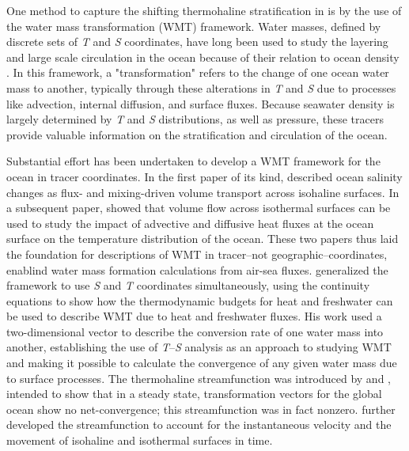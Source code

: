 \documentclass[draft]{agujournal2019}
\begin{document}
One method to capture the shifting thermohaline stratification in is by the use of the water mass transformation (WMT) framework. Water masses, defined by discrete sets of \emph{T} and  \emph{S} coordinates, have long been used to study the layering and large scale circulation in the ocean because of their relation to ocean density \cite{sverdrup1942}. In this framework, a "transformation" refers to the change of one ocean water mass to another, typically through these alterations in \emph{T} and \emph{S} due to processes like advection, internal diffusion, and surface fluxes. Because seawater density is largely determined by \emph{T} and \emph{S} distributions, as well as pressure, these tracers provide valuable information on the stratification and circulation of the ocean.

Substantial effort has been undertaken to develop a WMT framework for the ocean in tracer coordinates. In the first paper of its kind,  described ocean salinity changes as flux- and mixing-driven volume transport across isohaline surfaces. In a subsequent paper,  showed that volume flow across isothermal surfaces can be used to study the impact of advective and diffusive heat fluxes at the ocean surface on the temperature distribution of the ocean. These two papers thus laid the foundation for descriptions of WMT in tracer--not geographic--coordinates, enablind water mass formation calculations from air-sea fluxes.  generalized the  framework to use \emph{S} and \emph{T} coordinates simultaneously, using the continuity equations to show how the thermodynamic budgets for heat and freshwater can be used to describe WMT due to heat and freshwater fluxes. His work used a two-dimensional vector to describe the conversion rate of one water mass into another, establishing the use of \emph{T}--\emph{S} analysis as an approach to studying WMT and making it possible to calculate the convergence of any given water mass due to surface processes. The thermohaline streamfunction was introduced by  and , intended to show that in a steady state, transformation vectors for the global ocean show no net-convergence; this streamfunction was in fact nonzero.  further developed the streamfunction to account for the instantaneous velocity and the movement of isohaline and isothermal surfaces in time.
\end{document}
